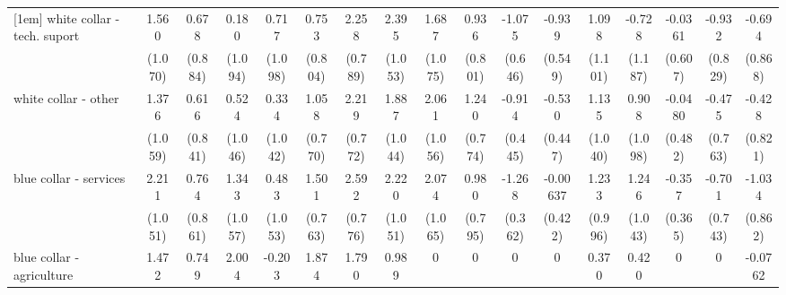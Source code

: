 {\begin{tabular}{l*{16}{c}}
[1em]
white collar - tech. suport&       1.560         &       0.678         &       0.180         &       0.717         &       0.753         &       2.258\sym{**} &       2.395\sym{*}  &       1.687         &       0.936         &      -1.075         &      -0.939         &       1.098         &      -0.728         &     -0.0361         &      -0.932         &      -0.694         \\
                    &     (1.070)         &     (0.884)         &     (1.094)         &     (1.098)         &     (0.804)         &     (0.789)         &     (1.053)         &     (1.075)         &     (0.801)         &     (0.646)         &     (0.549)         &     (1.101)         &     (1.187)         &     (0.607)         &     (0.829)         &     (0.868)         \\
[1em]
white collar - other&       1.376         &       0.616         &       0.524         &       0.334         &       1.058         &       2.219\sym{**} &       1.887         &       2.061         &       1.240         &      -0.914\sym{*}  &      -0.530         &       1.135         &       0.908         &     -0.0480         &      -0.475         &      -0.428         \\
                    &     (1.059)         &     (0.841)         &     (1.046)         &     (1.042)         &     (0.770)         &     (0.772)         &     (1.044)         &     (1.056)         &     (0.774)         &     (0.445)         &     (0.447)         &     (1.040)         &     (1.098)         &     (0.482)         &     (0.763)         &     (0.821)         \\
[1em]
blue collar - services&       2.211\sym{*}  &       0.764         &       1.343         &       0.483         &       1.501\sym{*}  &       2.592\sym{***}&       2.220\sym{*}  &       2.074         &       0.980         &      -1.268\sym{***}&    -0.00637         &       1.233         &       1.246         &      -0.357         &      -0.701         &      -1.034         \\
                    &     (1.051)         &     (0.861)         &     (1.057)         &     (1.053)         &     (0.763)         &     (0.776)         &     (1.051)         &     (1.065)         &     (0.795)         &     (0.362)         &     (0.422)         &     (0.996)         &     (1.043)         &     (0.365)         &     (0.743)         &     (0.862)         \\
[1em]
blue collar - agriculture&       1.472         &       0.749         &       2.004         &      -0.203         &       1.874         &       1.790         &       0.989         &           0         &           0         &           0         &           0         &       0.370         &       0.420         &           0         &           0         &     -0.0762         \\

\end{tabular}}
